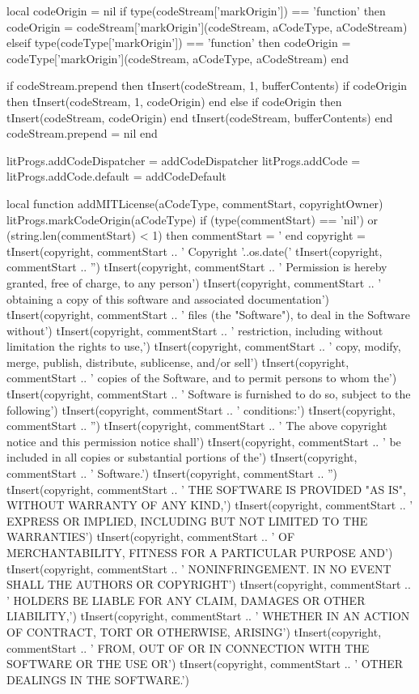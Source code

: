   local codeOrigin      = nil
    if type(codeStream['markOrigin']) == 'function' then
      codeOrigin =
        codeStream['markOrigin'](codeStream, aCodeType, aCodeStream)
    elseif type(codeType['markOrigin']) == 'function' then
      codeOrigin =
        codeType['markOrigin'](codeStream, aCodeType, aCodeStream)
    end

  if codeStream.prepend then
    tInsert(codeStream, 1, bufferContents)
    if codeOrigin then 
      tInsert(codeStream, 1, codeOrigin)
    end
  else
    if codeOrigin then
      tInsert(codeStream, codeOrigin)
    end
    tInsert(codeStream, bufferContents)
  end
  codeStream.prepend = nil
end

litProgs.addCodeDispatcher = addCodeDispatcher
litProgs.addCode           = {}
litProgs.addCode.default   = addCodeDefault

local function addMITLicense(aCodeType, commentStart, copyrightOwner)
  litProgs.markCodeOrigin(aCodeType)
  if (type(commentStart) == 'nil') or (string.len(commentStart) < 1) then
    commentStart = '%
  end
  copyright = { }
  tInsert(copyright, commentStart ..
    ' Copyright '..os.date('%
  tInsert(copyright,  commentStart .. 
    '')
  tInsert(copyright, commentStart ..
    ' Permission is hereby granted, free of charge, to any person')
  tInsert(copyright, commentStart ..
    ' obtaining a copy of this software and associated documentation')
  tInsert(copyright, commentStart ..
    ' files (the "Software"), to deal in the Software without')
  tInsert(copyright, commentStart ..
    ' restriction, including without limitation the rights to use,')
  tInsert(copyright, commentStart ..
    ' copy, modify, merge, publish, distribute, sublicense, and/or sell')
  tInsert(copyright, commentStart ..
    ' copies of the Software, and to permit persons to whom the')
  tInsert(copyright, commentStart ..
    ' Software is furnished to do so, subject to the following')
  tInsert(copyright, commentStart ..
    ' conditions:')
  tInsert(copyright, commentStart ..
    '')
  tInsert(copyright, commentStart ..
    '    The above copyright notice and this permission notice shall')
  tInsert(copyright, commentStart ..
    '    be included in all copies or substantial portions of the')
  tInsert(copyright, commentStart ..
    '    Software.')
  tInsert(copyright, commentStart ..
    '')
  tInsert(copyright, commentStart ..
    ' THE SOFTWARE IS PROVIDED "AS IS", WITHOUT WARRANTY OF ANY KIND,')
  tInsert(copyright, commentStart ..
    ' EXPRESS OR IMPLIED, INCLUDING BUT NOT LIMITED TO THE WARRANTIES')
  tInsert(copyright, commentStart ..
    ' OF MERCHANTABILITY, FITNESS FOR A PARTICULAR PURPOSE AND')
  tInsert(copyright, commentStart ..
    ' NONINFRINGEMENT. IN NO EVENT SHALL THE AUTHORS OR COPYRIGHT')
  tInsert(copyright, commentStart ..
    ' HOLDERS BE LIABLE FOR ANY CLAIM, DAMAGES OR OTHER LIABILITY,')
  tInsert(copyright, commentStart ..
    ' WHETHER IN AN ACTION OF CONTRACT, TORT OR OTHERWISE, ARISING')
  tInsert(copyright, commentStart ..
    ' FROM, OUT OF OR IN CONNECTION WITH THE SOFTWARE OR THE USE OR')
  tInsert(copyright, commentStart ..
    ' OTHER DEALINGS IN THE SOFTWARE.')

